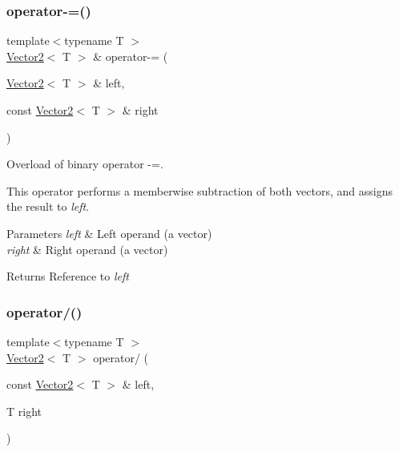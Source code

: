 \subsubsection{\texorpdfstring{operator-\/=()}{operator-=()}}
{\footnotesize\ttfamily template$<$typename T $>$ \\
\mbox{\hyperlink{classsf_1_1_vector2}{Vector2}}$<$ T $>$ \& operator-\/= (\begin{DoxyParamCaption}\item[{\mbox{\hyperlink{classsf_1_1_vector2}{Vector2}}$<$ T $>$ \&}]{left,  }\item[{const \mbox{\hyperlink{classsf_1_1_vector2}{Vector2}}$<$ T $>$ \&}]{right }\end{DoxyParamCaption})\hspace{0.3cm}{\ttfamily [related]}}



Overload of binary operator -\/=. 

This operator performs a memberwise subtraction of both vectors, and assigns the result to {\itshape left}.


\begin{DoxyParams}{Parameters}
{\em left} & Left operand (a vector) \\
\hline
{\em right} & Right operand (a vector)\\
\hline
\end{DoxyParams}
\begin{DoxyReturn}{Returns}
Reference to {\itshape left} \begin{DoxyVerb}\end{DoxyVerb}
 
\end{DoxyReturn}
\mbox{\label{classsf_1_1_vector2_a7409dd89cb3aad6c3bc6622311107311}} 
\subsubsection{\texorpdfstring{operator/()}{operator/()}}
{\footnotesize\ttfamily template$<$typename T $>$ \\
\mbox{\hyperlink{classsf_1_1_vector2}{Vector2}}$<$ T $>$ operator/ (\begin{DoxyParamCaption}\item[{const \mbox{\hyperlink{classsf_1_1_vector2}{Vector2}}$<$ T $>$ \&}]{left,  }\item[{T}]{right }\end{DoxyParamCaption})\hspace{0.3cm}{\ttfamily [related]}}



